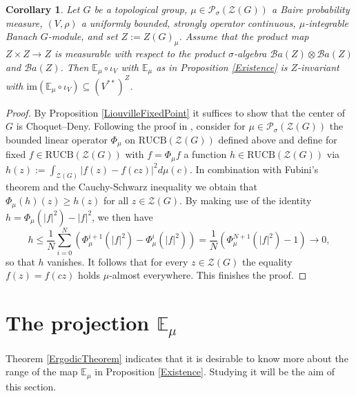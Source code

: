 \documentclass[a4paper,11pt,reqno]{amsart}
\numberwithin{equation}{section}
\newtheorem{corollary}[theorem]{Corollary}
\theoremstyle{definition}
\theoremstyle{remark}
\theoremstyle{remark}
\begin{document}
\begin{corollary} \label{CenterFixedPoint} Let $G$ be a topological group, $\mu\in\mathcal{P}_{\sigma}(\mathcal{Z}(G))$ a Baire probability measure, $(V,\rho)$ a uniformly bounded, strongly operator continuous, $\mu$-integrable Banach $G$-module, and set $Z:=Z(G)_{\mu}$. Assume that the product map $Z\times Z\rightarrow Z$ is measurable with respect to the product $\sigma$-algebra $\mathcal{B}a(Z)\otimes\mathcal{B}a(Z)$ and $\mathcal{B}a(Z)$. Then $\mathbb{E}_{\mu}\circ\iota_{V}$ with $\mathbb{E}_{\mu}$ as in Proposition \ref{Existence} is $Z$-invariant with \emph{$\text{im}(\mathbb{E}_{\mu}\circ\iota_{V})\subseteq(V^{\ast\ast})^{Z}$}. \end{corollary}

\begin{proof} By Proposition \ref{LiouvilleFixedPoint} it suffices to show that the center of $G$ is Choquet--Deny. Following the proof in \cite{Prunaru00}, consider for $\mu\in\mathcal{P}_{\sigma}(\mathcal{Z}(G))$ the bounded linear operator $\Phi_{\mu}$ on $\text{RUCB}(\mathcal{Z}(G))$ defined above and define for fixed $f\in\text{RUCB}(\mathcal{Z}(G))$ with $f=\Phi_{\mu}f$ a function $h\in\text{RUCB}(\mathcal{Z}(G))$ via $h(z):=\int_{\mathcal{Z}(G)}|f(z)-f(cz)|^{2}d\mu(c)$. In combination with Fubini's theorem and the Cauchy-Schwarz inequality we obtain that $\Phi_{\mu}(h)(z)\geq h(z)$ for all $z\in\mathcal{Z}(G)$. By making use of the identity $h=\Phi_{\mu}(|f|^{2})-|f|^{2}$, we then have 
\[
h\leq\frac{1}{N}\sum_{i=0}^{N}\left(\Phi_{\mu}^{i+1}(|f|^{2})-\Phi_{\mu}^{i}(|f|^{2})\right)=\frac{1}{N}\left(\Phi_{\mu}^{N+1}(|f|^{2})-1\right)\rightarrow0,
\]
so that $h$ vanishes. It follows that for every $z\in\mathcal{Z}(G)$ the equality $f(z)=f(cz)$ holds $\mu$-almost everywhere. This finishes the proof. \end{proof}

\vspace{3mm}



\section{The projection $\mathbb{E}_{\mu}$\label{sec:The-projection}}

Theorem \ref{ErgodicTheorem} indicates that it is desirable to know more about the range of the map $\mathbb{E}_{\mu}$ in Proposition \ref{Existence}. Studying it will be the aim of this section.
\end{document}
